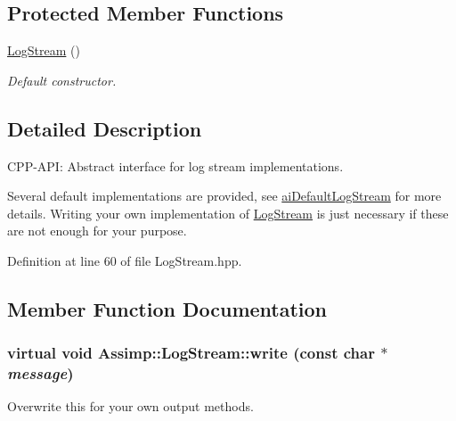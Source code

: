 \subsection*{Protected Member Functions}
\begin{CompactItemize}
\item 
\hypertarget{class_assimp_1_1_log_stream_c6863075fc4a6fcffd76ad6af80c18bc}{
\hyperlink{class_assimp_1_1_log_stream_c6863075fc4a6fcffd76ad6af80c18bc}{LogStream} ()}
\label{class_assimp_1_1_log_stream_c6863075fc4a6fcffd76ad6af80c18bc}

\begin{CompactList}\small\item\em Default constructor. \item\end{CompactList}\end{CompactItemize}


\subsection{Detailed Description}
CPP-API: Abstract interface for log stream implementations. 

Several default implementations are provided, see \hyperlink{types_8h_e4271f61a7c06cd4770fc3e11f58f9c6}{aiDefaultLogStream} for more details. Writing your own implementation of \hyperlink{class_assimp_1_1_log_stream}{LogStream} is just necessary if these are not enough for your purpose. 

Definition at line 60 of file LogStream.hpp.

\subsection{Member Function Documentation}
\hypertarget{class_assimp_1_1_log_stream_b0bfcb5ab9988ef65d7222a50f6e8d37}{
\subsubsection[write]{\setlength{\rightskip}{0pt plus 5cm}virtual void Assimp::LogStream::write (const char $\ast$ {\em message})}}
\label{class_assimp_1_1_log_stream_b0bfcb5ab9988ef65d7222a50f6e8d37}


Overwrite this for your own output methods. 

